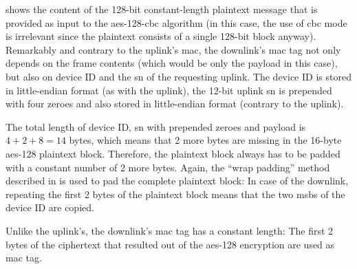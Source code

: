  shows the content of the 128-bit constant-length plaintext message that is provided as input to the \gls{aes}-128-\gls{cbc} algorithm (in this case, the use of \gls{cbc} mode is irrelevant since the plaintext consists of a single 128-bit block anyway).
Remarkably and contrary to the uplink's \gls{mac}, the downlink's \gls{mac} tag not only depends on the frame contents (which would be only the payload in this case), but also on device ID and the \gls{sn} of the requesting uplink.
The device ID is stored in little-endian format (as with the uplink), the 12-bit uplink \gls{sn} is prepended with four zeroes and also stored in little-endian format (contrary to the uplink).

The total length of device ID, \gls{sn} with prepended zeroes and payload is $4 + 2 + 8 = 14$ bytes, which means that 2 more bytes are missing in the 16-byte \gls{aes}-128 plaintext block.
Therefore, the plaintext block always has to be padded with a constant number of 2 more bytes.
Again, the ``wrap padding'' method described in  is used to pad the complete plaintext block:
In case of the downlink, repeating the first 2 bytes of the plaintext block means that the two \glspl{msb} of the device ID are copied.

Unlike the uplink's, the downlink's \gls{mac} tag has a constant length:
The first 2 bytes of the ciphertext that resulted out of the \gls{aes}-128 encryption are used as \gls{mac} tag.


